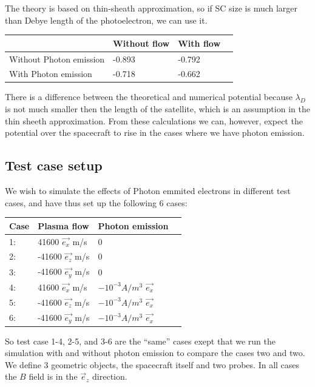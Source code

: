 The theory is based on thin-sheath approximation, so if SC size is much larger than Debye length of the photoelectron, we can use it.\\

\begin{center}
    \begin{tabular}{ | l | l | l | p{5cm} |}
    \hline
     & Without flow & With flow  \\ \hline
     Without Photon emission & -0.893   & -0.792 \\ \hline
     With Photon emission & -0.718 & -0.662 \\
    \hline
    \end{tabular}
\end{center}

There is a difference between the theoretical and numerical potential because $\lambda_D$ is not much
smaller then the length of the satellite, which is an assumption in the thin sheeth approximation.
From these calculations we can, however, expect the potential over the spacecraft to rise
in the cases where we have photon emission.

\subsection{Test case setup}

We wish to simulate the effects of Photon emmited electrons in different test cases, and have thus set up the following
6 cases:
\begin{center}
    \begin{tabular}{ | l | l | l | p{5cm} |}
    \hline
    Case & Plasma flow & Photon emission  \\ \hline
     1: & 41600 $\vec{e_x}$ m/s  & 0 \\ \hline
     2: & -41600 $\vec{e_z}$ m/s & 0 \\ \hline
     3: & -41600 $\vec{e_y}$ m/s & 0 \\ \hline
     4: & 41600 $\vec{e_x}$ m/s & $-10^{-3} A/m^{3}$ $\vec{e_x}$\\ \hline
     5: & -41600 $\vec{e_z}$ m/s & $-10^{-3} A/m^{3}$ $\vec{e_x}$\\ \hline
     6: & -41600 $\vec{e_y}$ m/s & $-10^{-3} A/m^{3}$  $\vec{e_x}$\\
    \hline
    \end{tabular}
\end{center}

So test case 1-4, 2-5, and 3-6 are the ``same'' cases exept that we run the simulation with and without
photon emission to compare the cases two and two. We define 3 geometric objects, the spacecraft itself
and two probes. In all cases the $B$ field is in the $\vec e_z$ direction.

